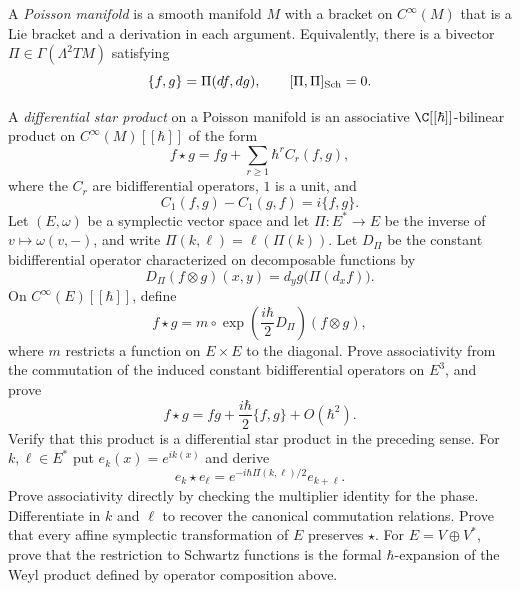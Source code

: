 \begin{exercise}
A \emph{Poisson manifold} is a smooth manifold $M$ with a bracket on
$C^\infty(M)$ that is a Lie bracket and a derivation in each argument.
Equivalently, there is a bivector $\Pi\in\Gamma(\Lambda^2TM)$ satisfying
\[
\{f,g\}=\Pi(df,dg),
\qquad [\Pi,\Pi]_{\rm Sch}=0.
\]

A \emph{differential star product} on a Poisson manifold is an associative
$\C[[\hbar]]$-bilinear product on $C^\infty(M)[[\hbar]]$ of the form
\[
f\star g=fg+\sum_{r\geq1}\hbar^rC_r(f,g),
\]
where the $C_r$ are bidifferential operators, $1$ is a unit, and
\[
C_1(f,g)-C_1(g,f)=i\{f,g\}.
\]
Let $(E,\omega)$ be a symplectic vector space and let
$\Pi:E^*\to E$ be the inverse of $v\mapsto\omega(v,-)$, and write
$\Pi(k,\ell)=\ell(\Pi(k))$.  Let $D_\Pi$ be the constant bidifferential
operator characterized on decomposable functions by
\[
D_\Pi(f\otimes g)(x,y)
=d_yg\bigl(\Pi(d_xf)\bigr).
\]
On $C^\infty(E)[[\hbar]]$, define
\[
f\star g
=m\circ\exp\!\left(\frac{i\hbar}{2}D_\Pi\right)(f\otimes g),
\]
where $m$ restricts a function on $E\times E$ to the diagonal.  Prove
associativity from the commutation of the induced constant bidifferential
operators on $E^3$, and prove
\[
f\star g=fg+\frac{i\hbar}{2}\{f,g\}+O(\hbar^2).
\]
Verify that this product is a differential star product in the preceding
sense.
For $k,\ell\in E^*$ put $e_k(x)=e^{ik(x)}$ and derive
\[
e_k\star e_\ell
=e^{-i\hbar\Pi(k,\ell)/2}e_{k+\ell}.
\]
Prove associativity directly by checking the multiplier identity for the
phase.  Differentiate in $k$ and $\ell$ to recover the canonical
commutation relations.  Prove that every affine symplectic transformation
of $E$ preserves $\star$.  For $E=V\oplus V^*$, prove that the restriction
to Schwartz functions is the formal $\hbar$-expansion of the Weyl product
defined by operator composition above.
\end{exercise}

